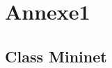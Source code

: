 
\section{Annexe1}
\label{sec:annexe1:annexe1}



\subsection{Class Mininet}
\label{sec:annexe1:mininetClass}

